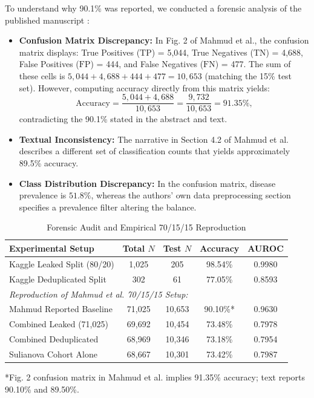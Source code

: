 \documentclass[journal]{IEEEtran}
\begin{document}
To understand why 90.1\% was reported, we conducted a forensic analysis of the published manuscript \cite{mahmud2025}:
\begin{itemize}
    \item \textbf{Confusion Matrix Discrepancy:} In Fig. 2 of Mahmud et al., the confusion matrix displays: True Positives ($\text{TP}$) = 5,044, True Negatives ($\text{TN}$) = 4,688, False Positives ($\text{FP}$) = 444, and False Negatives ($\text{FN}$) = 477. The sum of these cells is $5,044 + 4,688 + 444 + 477 = 10,653$ (matching the 15\% test set). However, computing accuracy directly from this matrix yields:
    \begin{equation}
    \text{Accuracy} = \frac{5,044 + 4,688}{10,653} = \frac{9,732}{10,653} = 91.35\%,
    \end{equation}
    contradicting the 90.1\% stated in the abstract and text.
    \item \textbf{Textual Inconsistency:} The narrative in Section 4.2 of Mahmud et al. describes a different set of classification counts that yields approximately 89.5\% accuracy.
    \item \textbf{Class Distribution Discrepancy:} In the confusion matrix, disease prevalence is $51.8\%$, whereas the authors' own data preprocessing section specifies a prevalence filter altering the balance.
\end{itemize}

\begin{table}[t]
\caption{Forensic Audit and Empirical 70/15/15 Reproduction}
\label{tab:forensic_audit}
\centering
\begin{tabular}{lcccc}
\toprule
\textbf{Experimental Setup} & \textbf{Total $N$} & \textbf{Test $N$} & \textbf{Accuracy} & \textbf{AUROC} \\
\midrule
Kaggle Leaked Split (80/20) & 1,025 & 205 & 98.54\% & 0.9980 \\
Kaggle Deduplicated Split   & 302   & 61  & 77.05\% & 0.8593 \\
\midrule
\multicolumn{5}{l}{\textit{Reproduction of Mahmud et al. 70/15/15 Setup:}} \\
Mahmud Reported Baseline    & 71,025 & 10,653 & 90.10\%* & 0.9630 \\
Combined Leaked (71,025)    & 69,692 & 10,454 & 73.48\% & 0.7978 \\
Combined Deduplicated       & 68,969 & 10,346 & 73.18\% & 0.7954 \\
Sulianova Cohort Alone      & 68,667 & 10,301 & 73.42\% & 0.7987 \\
\bottomrule
\end{tabular}
\begin{flushleft}
\footnotesize{*Fig. 2 confusion matrix in Mahmud et al. implies 91.35\% accuracy; text reports 90.10\% and 89.50\%.}
\end{flushleft}
\end{table}
\end{document}
